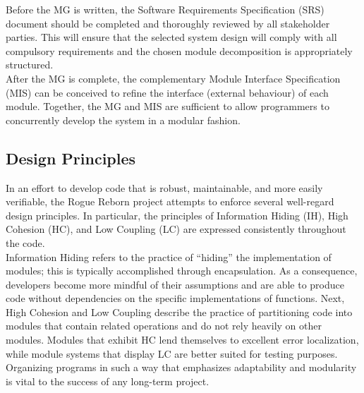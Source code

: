 \documentclass[12pt, titlepage]{article}
\begin{document}
        Before the MG is written, the Software Requirements Specification (SRS) document should be completed and thoroughly reviewed by all stakeholder parties.  This will ensure that the selected system design will comply with all compulsory requirements and the chosen module decomposition is appropriately structured.\\

        After the MG is complete, the complementary Module Interface Specification (MIS) can be conceived to refine the interface (external behaviour) of each module.  Together, the MG and MIS are sufficient to allow programmers to concurrently develop the system in a modular fashion.
    
    \subsection{Design Principles}
        In an effort to develop code that is robust, maintainable, and more easily verifiable, the Rogue Reborn project attempts to enforce several well-regard design principles.  In particular, the principles of Information Hiding (IH), High Cohesion (HC), and Low Coupling (LC) are expressed consistently throughout the code. \\

        Information Hiding refers to the practice of ``hiding'' the implementation of modules; this is typically accomplished through encapsulation.  As a consequence, developers become more mindful of their assumptions and are able to produce code without dependencies on the specific implementations of functions.  Next, High Cohesion and Low Coupling describe the practice of partitioning code into modules that contain related operations and do not rely heavily on other modules.  Modules that exhibit HC lend themselves to excellent error localization, while module systems that display LC are better suited for testing purposes.  Organizing programs in such a way that emphasizes adaptability and modularity is vital to the success of any long-term project.
\end{document}
